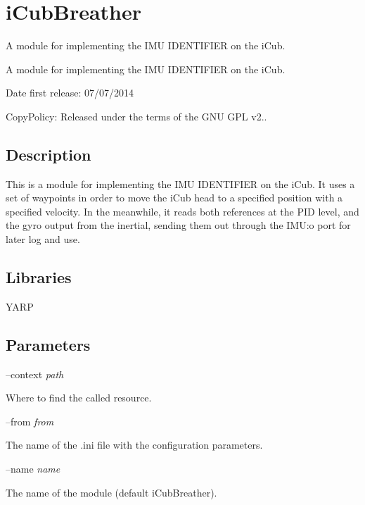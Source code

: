 \section{i\+Cub\+Breather}
\label{group__icub__iCubBreather}


A module for implementing the I\+M\+U I\+D\+E\+N\+T\+I\+F\+I\+E\+R on the i\+Cub.  


A module for implementing the I\+M\+U I\+D\+E\+N\+T\+I\+F\+I\+E\+R on the i\+Cub. 

Date first release\+: 07/07/2014

Copy\+Policy\+: Released under the terms of the G\+N\+U G\+P\+L v2..\hypertarget{group__icub__iCubWriter_intro_sec}{}\subsection{Description}\label{group__icub__iCubWriter_intro_sec}
This is a module for implementing the I\+M\+U I\+D\+E\+N\+T\+I\+F\+I\+E\+R on the i\+Cub. It uses a set of waypoints in order to move the i\+Cub head to a specified position with a specified velocity. In the meanwhile, it reads both references at the P\+I\+D level, and the gyro output from the inertial, sending them out through the I\+M\+U\+:o port for later log and use.\hypertarget{group__icub__iCubWriter_lib_sec}{}\subsection{Libraries}\label{group__icub__iCubWriter_lib_sec}
Y\+A\+R\+P\hypertarget{group__icub__iCubWriter_parameters_sec}{}\subsection{Parameters}\label{group__icub__iCubWriter_parameters_sec}
--context {\itshape path} 
\begin{DoxyItemize}
\item Where to find the called resource.
\end{DoxyItemize}

--from {\itshape from} 
\begin{DoxyItemize}
\item The name of the .ini file with the configuration parameters.
\end{DoxyItemize}

--name {\itshape name} 
\begin{DoxyItemize}
\item The name of the module (default i\+Cub\+Breather).
\end{DoxyItemize}

